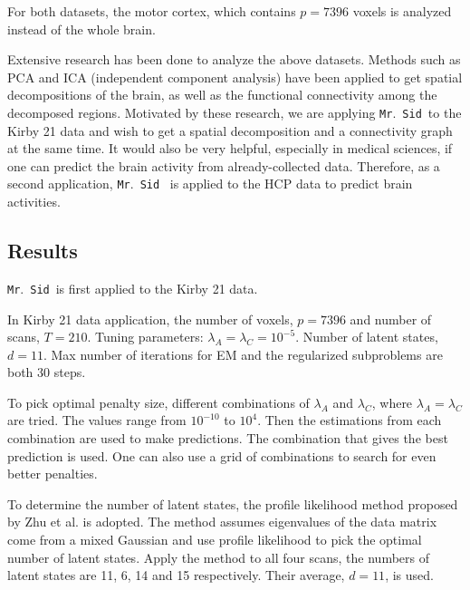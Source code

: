 \documentclass[fleqn,12pt]{article}
\newcommand{\mrsid}{{\sc \texttt{Mr}.~\texttt{Sid}}}
\begin{document}
For both datasets, the motor cortex, which contains $p=7396$ voxels is analyzed instead of the whole brain.

Extensive research has been done to analyze the above datasets. Methods such as PCA and ICA (independent component analysis) have been applied to get spatial decompositions of the brain, as well as the functional connectivity among the decomposed regions. Motivated by these research, we are applying \mrsid~to the Kirby 21 data and wish to get a spatial decomposition and a connectivity graph at the same time. It would also be very helpful, especially in medical sciences, if one can predict the brain activity from already-collected data. Therefore, as a second application, \mrsid~ is applied to the HCP data to predict brain activities.

\subsection{Results}

\mrsid~is first applied to the Kirby 21 data.

In Kirby 21 data application,  the number of voxels, $p = 7396$ and number of scans, $T = 210$. Tuning parameters: $\lambda_A = \lambda_C = 10^{-5}$. Number of latent states, $d = 11$. Max number of iterations for EM and the regularized subproblems are both 30 steps.

To pick optimal penalty size, different combinations of $\lambda_A$ and $\lambda_C$, where $\lambda_A = \lambda_C$ are tried. The values range from $10^{-10}$ to $10^{4}$. Then the estimations from each combination are used to make predictions. The combination that gives the best prediction is used. One can also use a grid of combinations to search for even better penalties.

To determine the number of latent states, the profile likelihood method proposed by Zhu et al. \citep{zhu2006automatic} is adopted. The method assumes eigenvalues of the data matrix come from a mixed Gaussian and use profile likelihood to pick the optimal number of latent states. Apply the method to all four scans, the numbers of latent states are 11, 6, 14 and 15 respectively. Their average, $d=11$, is used.
\end{document}
